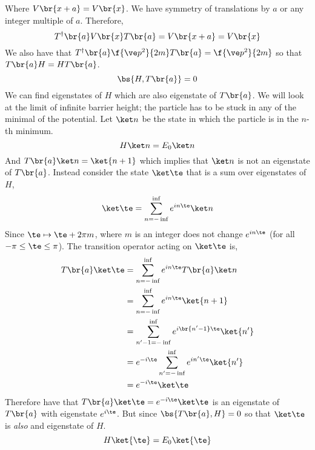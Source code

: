 \documentclass{article}
\begin{document}
Where $V\br{x + a} = V\br{x}$. We have symmetry of translations by $a$ or any integer multiple of $a$. Therefore,
\[ T^{\dagger}\br{a}V\br{x}T\br{a} = V\br{x + a} = V\br{x} \]
We also have that $T^{\dagger}\br{a} \f{\ve p^2}{2m} T\br{a} = \f{\ve p^2}{2m}$ so that $T\br{a} H = H T\br{a}$.
\[ \bs{H, T\br{a}} = 0 \]
We can find eigenstates of $H$ which are also eigenstate of $T\br{a}$. We will look at the limit of infinite barrier height; the particle has to be stuck in any of the minimal of the potential. Let $\ket n$ be the state in which the particle is in the $n$-th minimum.
\[ H\ket n = E_0 \ket n \]
And $T\br{a} \ket n = \ket {n+1}$ which implies that $\ket n$ is not an eigenstate of $T\br{a}$. Instead consider the state $\ket \te$ that is a sum over eigenstates of $H$,
\[ \ket \te = \sum_{n = -\inf}^{\inf} e^{i n \te} \ket n \]
Since $\te \mapsto \te + 2 \pi m$, where $m$ is an integer does not change $e^{i n \te}$ (for all $ -\pi \leq \te \leq \pi$). The transition operator acting on $\ket \te$ is,
\begin{align*}
    T\br{a} \ket \te
    &= \sum_{n = - \inf}^{\inf} e^{i n \te} T\br{a} \ket n \\
    &= \sum_{n = - \inf}^{\inf} e^{i n \te} \ket {n+1} \\
    &= \sum_{n' - 1 = - \inf}^{\inf} e^{i \br{n' - 1} \te} \ket {n'} \\
    &= e^{-i\te}\sum_{n' = - \inf}^{\inf} e^{i n' \te} \ket {n'} \\
    &= e^{-i\te}\ket \te
\end{align*}
Therefore have that $T\br{a} \ket \te = e^{-i \te} \ket \te$ is an eigenstate of $T\br{a}$ with eigenstate $e^{i \te}$. But since $\bs{T\br{a}, H} = 0$ so that $\ket \te$ is \textit{also} and eigenstate of $H$.
\[ H \ket{\te} = E_{0} \ket {\te} \]
\end{document}
